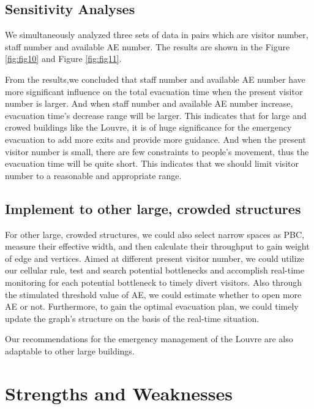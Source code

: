 \documentclass[12pt]{article}
\begin{document}
\subsection{Sensitivity Analyses}
We simultaneously analyzed three sets of data in pairs which are visitor number, staff number and available AE number. The results are shown in the Figure \ref{fig:fig10} and Figure \ref{fig:fig11}.

From the results,we concluded that staff number and available AE number have more significant influence on the total evacuation time when the present visitor number is larger. And when staff number and available AE number increase, evacuation time's decrease range will be larger. This indicates that for large and crowed buildings like the Louvre, it is of huge significance for the emergency evacuation to add more exits and provide more guidance. 
And when the present visitor number is small, there are few constraints to people's movement, thus the evacuation time will be quite short. This indicates that we should limit visitor number to a reasonable and appropriate range.


\subsection{Implement to other large, crowded structures}

For other large, crowded structures, we could also select narrow spaces as PBC, measure  their effective width, and then calculate their throughput to gain weight of edge and vertices. Aimed at different present visitor number, we could utilize our cellular rule, test and search potential bottlenecks and accomplish real-time monitoring for each potential bottleneck to timely divert visitors. Also through the stimulated threshold value of AE, we could estimate whether to open more AE or not. Furthermore, to gain the optimal evacuation plan, we could timely update the graph's structure on the basis of the real-time situation. 


Our recommendations for the emergency management of the Louvre are also adaptable to other large buildings. 



\section{Strengths and Weaknesses}
\end{document}
